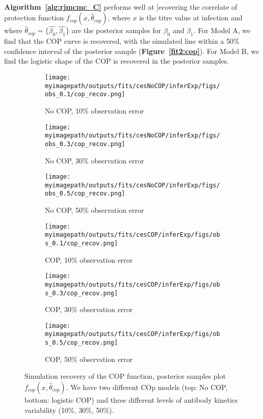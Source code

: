 \paragraph{} \textbf{Algorithm~\ref{alg:rjmcmc_C}} performs well at ]ecovering the correlate of protection function $f_{cop}(x, \hat{\theta}_{cop})$, where $x$ is the titre value at infection and where $\hat{\theta}_{cop} = \{\hat{\beta_0}, \hat{\beta_1}\}$ are the posterior samples for $\beta_0$ and $\beta_1$. For Model A, we find that the COP curve is recovered, with the simulated line within a 50\% confidence interval of the posterior sample (\textbf{Figure~\ref{fit2:cop}}). For Model B, we find the logistic shape of the COP is recovered in the posterior samples. 

\begin{figure}[H]
\label{fit2:cop}
    \centering
    \begin{subfigure}{0.31\textwidth}
        \centering
        \texttt{[image: \\myimagepath/outputs/fits/cesNoCOP/inferExp/figs/obs\_0.1/cop\_recov.png]}
        \caption{No COP, 10\% observation error}
    \end{subfigure}
    \begin{subfigure}{0.31\textwidth}
        \centering
        \texttt{[image: \\myimagepath/outputs/fits/cesNoCOP/inferExp/figs/obs\_0.3/cop\_recov.png]}
        \caption{No COP, 30\% observation error}
    \end{subfigure}
    \begin{subfigure}{0.31\textwidth}
        \centering
        \texttt{[image: \\myimagepath/outputs/fits/cesNoCOP/inferExp/figs/obs\_0.5/cop\_recov.png]}
        \caption{No COP, 50\% observation error}
    \end{subfigure}
    
  \begin{subfigure}{0.31\textwidth}
        \centering
        \texttt{[image: \\myimagepath/outputs/fits/cesCOP/inferExp/figs/obs\_0.1/cop\_recov.png]}
        \caption{ COP, 10\% observation error}
    \end{subfigure}
    \begin{subfigure}{0.31\textwidth}
        \centering
        \texttt{[image: \\myimagepath/outputs/fits/cesCOP/inferExp/figs/obs\_0.3/cop\_recov.png]}
        \caption{ COP, 30\% observation error}
    \end{subfigure}
    \begin{subfigure}{0.31\textwidth}
        \centering
        \texttt{[image: \\myimagepath/outputs/fits/cesCOP/inferExp/figs/obs\_0.5/cop\_recov.png]}
        \caption{ COP, 50\% observation error}
    \end{subfigure}
    
    \caption{Simulation recovery of the COP function, posterior samples plot  $f_{cop}(x, \hat{\theta}_{cop})$. We have two different COp models (top: No COP, bottom: logistic COP) and three different levels of antibody kinetics variability (10\%, 30\%, 50\%).}
\end{figure}




